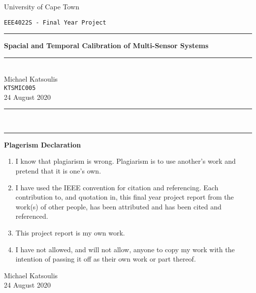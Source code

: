 \documentclass[BCOR13mm,DIV15]{scrartcl}
\begin{document}
\begin{titlepage}
    \setlength{\parindent}{0pt}
    \setlength{\parskip}{0pt}
    \begin{center}
        \vspace{-4cm}
        \huge University of Cape Town
    \end{center}
    \vspace{2.5cm}
    \begin{flushleft}
        \large \texttt{EEE4022S - Final Year Project}\\[8pt]
    \end{flushleft}

    \rule{\linewidth}{0.5pt}
    \begin{center}
    \vspace{10pt}
    \huge \textbf{Spacial and Temporal Calibration of Multi-Sensor Systems}\\[5pt]
    \rule{\linewidth}{0.5pt} \\[25pt]
    \LARGE Michael Katsoulis\\[5pt]
    \large \texttt{KTSMIC005} \\[1cm]
    24 August 2020\\ %
    \rule{5cm}{0.5pt}\\[-5pt]
    \rule{2.7cm}{0.5pt}
    \end{center}
    \Large{ \textbf{Plagerism Declaration}}

    \hrulefill
    \normalsize
    \begin{enumerate}
        \item I  know that  plagiarism is wrong. Plagiarism  is  to use  another's  work  and  pretend that  it is one's own.
        \item I  have  used  the IEEE convention  for  citation  and  referencing.  Each  contribution  to,  and quotation  in,  this final  year  project  report from  the  work(s)  of  other  people,  has  been attributed and has been cited and referenced.
        \item This project report is my own work.
        \item I have not allowed, and will not allow, anyone to copy my work with the intention of passing it off as their own work or part thereof.
    \end{enumerate}
    \begin{flushright}
        Michael Katsoulis\\
        24 August 2020
    \end{flushright}
    \hrulefill
\end{titlepage}
\end{document}

